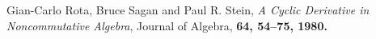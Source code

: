 \documentclass[11pt, a4paper]{book}
\begin{document}


\begin{thebibliography}{99}
  Gian-Carlo Rota, Bruce Sagan and Paul R. Stein,
  \emph{A Cyclic Derivative in Noncommutative Algebra},
  Journal of Algebra,
  \bf{64},
  54--75,
  1980.
\end{thebibliography}
\end{document}
